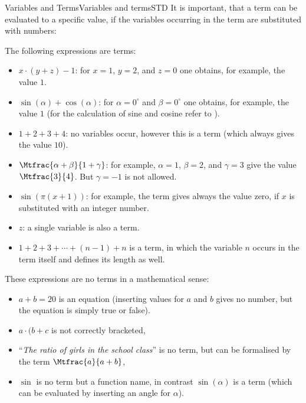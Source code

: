 \begin{MXContent}{Variables and Terms}{Variables and terms}{STD}
It is important, that a term can be evaluated to a specific value, if the variables occurring in the term are substituted 
with numbers:
\newpage
\begin{MExample}
The following expressions are terms:
\begin{itemize}
\item{$x\cdot (y+z)-1$: for $x=1$, $y=2$, and $z=0$ one obtains, for example, the value $1$.}
\item{$\sin(\alpha)+\cos(\alpha)$: for $\alpha=0^\circ$ and $\beta=0^\circ$ one obtains, for example, the value $1$ 
(for the calculation of sine and cosine refer to ).}
\item{$1+2+3+4$: no variables occur, however this is a term (which always gives the value $10$).}
\item{$\Mtfrac{\alpha+\beta}{1+\gamma}$: for example, $\alpha=1$, $\beta=2$, and $\gamma=3$ give the value 
$\Mtfrac{3}{4}$. But $\gamma=-1$ is not allowed.}
\item{$\sin(\pi (x+1))$: for example, the term gives always the value zero, if $x$ is substituted with an integer number.}
\item{$z$: a single variable is also a term.}
\item{$1+2+3+\cdots+(n-1)+n$ is a term, in which the variable $n$ occurs in the term itself and defines 
its length as well.}
\end{itemize}
\end{MExample}

\begin{MExample}
These expressions are no terms in a mathematical sense:
\begin{itemize}
\item{$a+b=20$ is an equation (inserting values for $a$ and $b$ gives no number, but the equation is simply true or false).}
\item{$a\cdot (b+c$ is not correctly bracketed,}
\item{``\textit{The ratio of girls in the school class}'' is no term, 
but can be formalised by the term $\Mtfrac{a}{a+b}$,}
\item{$\sin$ is no term but a function name, in contrast $\sin(\alpha)$ is a term (which can be evaluated by 
inserting an angle for $\alpha$).}
\end{itemize}
\end{MExample}


\end{MXContent}
